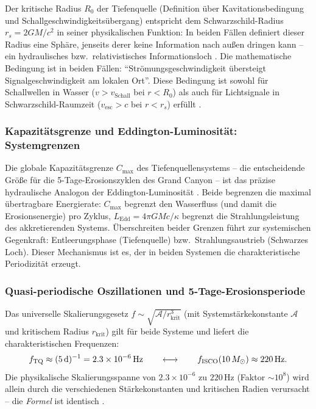 ﻿\documentclass[12pt,a4paper]{report}
\begin{document}
Der kritische Radius $R_0$ der Tiefenquelle (Definition über Kavitationsbedingung und Schallgeschwindigkeitsübergang) entspricht dem Schwarzschild-Radius $r_s = 2GM/c^2$ in seiner physikalischen Funktion: In beiden Fällen definiert dieser Radius eine Sphäre, jenseits derer keine Information nach außen dringen kann -- ein hydraulisches bzw.\ relativistisches Informationsloch \cite{penrose1965,penrose2004}. Die mathematische Bedingung ist in beiden Fällen: "`Strömungsgeschwindigkeit übersteigt Signalgeschwindigkeit am lokalen Ort"'. Diese Bedingung ist sowohl für Schallwellen in Wasser ($v > v_{\mathrm{Schall}}$ bei $r < R_0$) als auch für Lichtsignale in Schwarzschild-Raumzeit ($v_{\mathrm{esc}} > c$ bei $r < r_s$) erfüllt \cite{hawking1975,painleve1921}.

\subsubsection{Kapazitätsgrenze und Eddington-Luminosität: Systemgrenzen}

Die globale Kapazitätsgrenze $C_{\max}$ des Tiefenquellensystems -- die entscheidende Größe für die 5-Tage-Erosionszyklen des Grand Canyon -- ist das präzise hydraulische Analogon der Eddington-Luminosität \cite{eddington1926}. Beide begrenzen die maximal übertragbare Energierate: $C_{\max}$ begrenzt den Wasserfluss (und damit die Erosionsenergie) pro Zyklus, $L_{\mathrm{Edd}} = 4\pi GMc/\kappa$ begrenzt die Strahlungsleistung des akkretierenden Systems. Überschreiten beider Grenzen führt zur systemischen Gegenkraft: Entleerungsphase (Tiefenquelle) bzw.\ Strahlungsaustrieb (Schwarzes Loch). Dieser Mechanismus ist es, der in beiden Systemen die charakteristische Periodizität erzeugt.

\subsubsection{Quasi-periodische Oszillationen und 5-Tage-Erosionsperiode}

Das universelle Skalierungsgesetz $f \sim \sqrt{\mathcal{A}/r_{\mathrm{krit}}^3}$ (mit Systemstärkekonstante $\mathcal{A}$ und kritischem Radius $r_{\mathrm{krit}}$) gilt für beide Systeme und liefert die charakteristischen Frequenzen:
\begin{equation}
	f_{\mathrm{TQ}} \approx (5\,\mathrm{d})^{-1} = 2.3 \times 10^{-6}\,\mathrm{Hz}
	\qquad \longleftrightarrow \qquad
	f_{\mathrm{ISCO}}(10\,M_\odot) \approx 220\,\mathrm{Hz}.
	\notag
\end{equation}
Die physikalische Skalierungsspanne von $2.3 \times 10^{-6}$ zu $220\,\mathrm{Hz}$ (Faktor $\sim 10^8$) wird allein durch die verschiedenen Stärkekonstanten und kritischen Radien verursacht -- die \emph{Formel} ist identisch \cite{strohmayer2001}.
\end{document}
